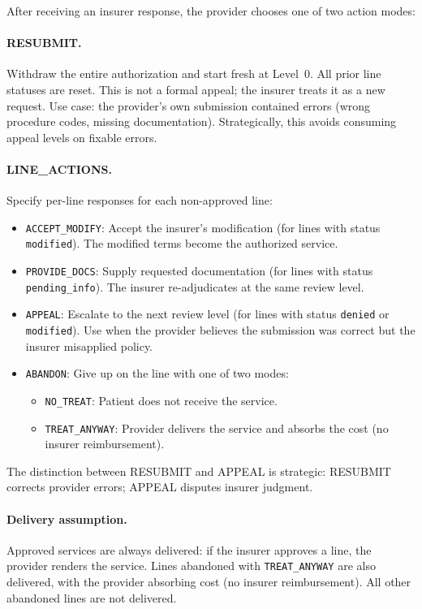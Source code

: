 After receiving an insurer response, the provider chooses one of two action modes:

\paragraph{RESUBMIT.} Withdraw the entire authorization and start fresh at Level~0. All prior line statuses are reset. This is not a formal appeal; the insurer treats it as a new request. Use case: the provider's own submission contained errors (wrong procedure codes, missing documentation). Strategically, this avoids consuming appeal levels on fixable errors.

\paragraph{LINE\_ACTIONS.} Specify per-line responses for each non-approved line:
\begin{itemize}
    \item \texttt{ACCEPT\_MODIFY}: Accept the insurer's modification (for lines with status \texttt{modified}). The modified terms become the authorized service.
    \item \texttt{PROVIDE\_DOCS}: Supply requested documentation (for lines with status \texttt{pending\_info}). The insurer re-adjudicates at the same review level.
    \item \texttt{APPEAL}: Escalate to the next review level (for lines with status \texttt{denied} or \texttt{modified}). Use when the provider believes the submission was correct but the insurer misapplied policy.
    \item \texttt{ABANDON}: Give up on the line with one of two modes:
    \begin{itemize}
        \item \texttt{NO\_TREAT}: Patient does not receive the service.
        \item \texttt{TREAT\_ANYWAY}: Provider delivers the service and absorbs the cost (no insurer reimbursement).
    \end{itemize}
\end{itemize}

The distinction between RESUBMIT and APPEAL is strategic: RESUBMIT corrects provider errors; APPEAL disputes insurer judgment.

\paragraph{Delivery assumption.}
Approved services are always delivered: if the insurer approves a line, the provider renders the service. Lines abandoned with \texttt{TREAT\_ANYWAY} are also delivered, with the provider absorbing cost (no insurer reimbursement). All other abandoned lines are not delivered.

